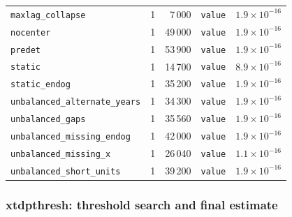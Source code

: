 \documentclass[
  10.5pt,
  a4paper,
]{article}
\begin{document}
\begin{longtable}{@{}p{3.6cm}rrp{4.9cm}r@{}}
\texttt{maxlag\_\allowbreak{}collapse} & 1 & 7\,000 & \texttt{value} & $1.9\times10^{-16}$ \\
\texttt{nocenter} & 1 & 49\,000 & \texttt{value} & $1.9\times10^{-16}$ \\
\texttt{predet} & 1 & 53\,900 & \texttt{value} & $1.9\times10^{-16}$ \\
\texttt{static} & 1 & 14\,700 & \texttt{value} & $8.9\times10^{-16}$ \\
\texttt{static\_\allowbreak{}endog} & 1 & 35\,200 & \texttt{value} & $1.9\times10^{-16}$ \\
\texttt{unbalanced\_\allowbreak{}alternate\_\allowbreak{}years} & 1 & 34\,300 & \texttt{value} & $1.9\times10^{-16}$ \\
\texttt{unbalanced\_\allowbreak{}gaps} & 1 & 35\,560 & \texttt{value} & $1.9\times10^{-16}$ \\
\texttt{unbalanced\_\allowbreak{}missing\_\allowbreak{}endog} & 1 & 42\,000 & \texttt{value} & $1.9\times10^{-16}$ \\
\texttt{unbalanced\_\allowbreak{}missing\_\allowbreak{}x} & 1 & 26\,040 & \texttt{value} & $1.1\times10^{-16}$ \\
\texttt{unbalanced\_\allowbreak{}short\_\allowbreak{}units} & 1 & 39\,200 & \texttt{value} & $1.9\times10^{-16}$ \\
\bottomrule
\end{longtable}

\subsubsection*{xtdpthresh: threshold search and final estimate}
\end{document}
